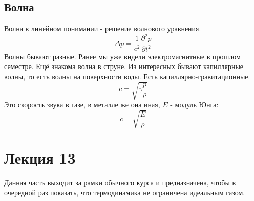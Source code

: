 \documentclass[a4paper, 12pt]{article}
\begin{document}
	\subsection{Волна}
	Волна в линейном понимании - решение волнового уравнения. 
	\begin{equation*}
		\Delta p = \frac{1}{c^{2}} \frac{\partial^{2} p}{\partial t^{2}}
	\end{equation*}
	Волны бывают разные. Ранее мы уже видели электромагнитные в прошлом семестре. Ещё знакома волна в струне. Из интересных бывают капиллярные волны, то есть волны на поверхности воды. Есть капиллярно-гравитационные.
	\begin{equation*}
		c = \sqrt{\gamma \frac{p}{\rho}}
	\end{equation*}
	Это скорость звука в газе, в металле же она иная, $E$ - модуль Юнга:
	\begin{equation*}
		c = \sqrt{\frac{E}{\rho}}
	\end{equation*}
	\section{Лекция 13}
	Данная часть выходит за рамки обычного курса и предназначена, чтобы в очередной раз показать, что термодинамика не ограничена идеальным газом.
\end{document}
